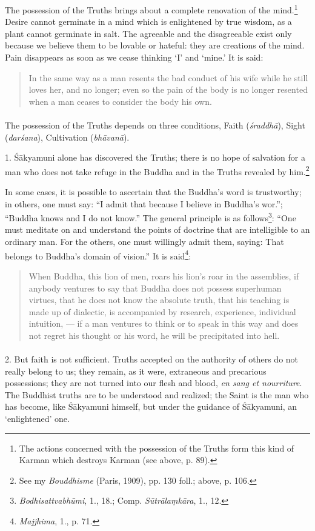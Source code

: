 \documentclass[a4paper, 11pt, oneside, english]{article}
\begin{document}
The possession of the Truths brings about a complete renovation of the mind.\footnote{The actions concerned with the possession of the Truths form this kind of Karman which destroys Karman (see above, p. 89).} Desire cannot germinate in a mind which is enlightened by true wisdom, as a plant cannot germinate in salt. The agreeable and the disagreeable exist only because we believe them to be lovable or hateful: they are creations of the mind. Pain disappears as soon as we cease thinking `I' and `mine.' It is said:
\begin{quotation}
\small
In the same way as a man resents the bad conduct of his wife while he still loves her, and no longer; even so the pain of the body is no longer resented when a man ceases to consider the body his own.
\end{quotation}
\paragraph{}
The possession of the Truths depends on three conditions, Faith (\emph{śraddhā}), Sight (\emph{darśana}), Cultivation (\emph{bhāvanā}).

1. Śākyamuni alone has discovered the Truths; there is no hope of salvation for a man who does not take refuge in the Buddha and in the Truths revealed by him.\footnote{See my \emph{Bouddhisme} (Paris, 1909), pp. 130 foll.; above, p. 106.}

In some cases, it is possible to ascertain that the Buddha's word is trustworthy; in others, one must say: ``I admit that because I believe in Buddha's wor.''; ``Buddha knows and I do not know.'' The general principle is as follows\footnote{\emph{Bodhisattvabhūmi}, 1., 18.; Comp. \emph{Sūtrālaṃkāra}, 1., 12.}: ``One must meditate on and understand the points of doctrine that are intelligible to an ordinary man. For the others, one must willingly admit them, saying: That belongs to Buddha's domain of vision.'' It is said\footnote{\emph{Majjhima}, 1., p. 71.}:
\begin{quotation}
\small
When Buddha, this lion of men, roars his lion's roar in the assemblies, if anybody ventures to say that Buddha does not possess superhuman virtues, that he does not know the absolute truth, that his teaching is made up of dialectic, is accompanied by research, experience, individual intuition, --- if a man ventures to think or to speak in this way and does not regret his thought or his word, he will be precipitated into hell.
\end{quotation}
\paragraph{}
2. But faith is not sufficient. Truths accepted on the authority of others do not really belong to us; they remain, as it were, extraneous and precarious possessions; they are not turned into our flesh and blood, \emph{en sang et nourriture}. The Buddhist truths are to be understood and realized; the Saint is the man who has become, like Śākyamuni himself, but under the guidance of Śākyamuni, an `enlightened' one.
\end{document}
